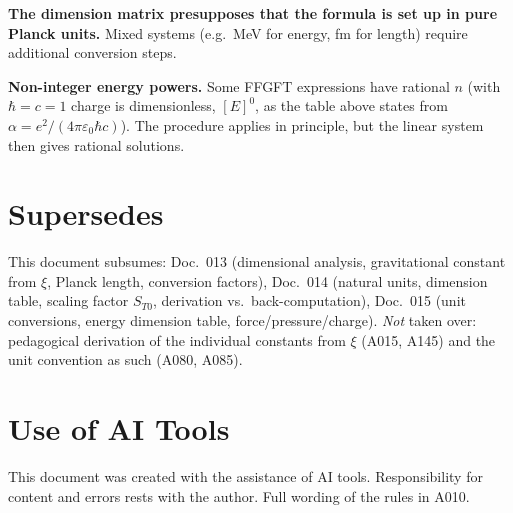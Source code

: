 \textbf{The dimension matrix presupposes that the formula is set up in pure Planck
units.} Mixed systems (e.g.\ MeV for energy, fm for length) require additional
conversion steps.

\textbf{Non-integer energy powers.} Some FFGFT expressions have rational $n$ (with $\hbar=c=1$ charge is dimensionless, $[E]^0$, as the table above states from $\alpha=e^2/(4\pi\varepsilon_0\hbar c)$). The procedure applies in principle, but the linear
system then gives rational solutions.

\section{Supersedes}

This document subsumes: Doc.~013 (dimensional analysis, gravitational constant
from $\xi$, Planck length, conversion factors), Doc.~014 (natural units,
dimension table, scaling factor $S_{T0}$, derivation vs.\ back-computation),
Doc.~015 (unit conversions, energy dimension table, force/pressure/charge).
\emph{Not} taken over: pedagogical derivation of the individual constants from
$\xi$ (A015, A145) and the unit convention as such (A080, A085).

\section{Use of AI Tools}

This document was created with the assistance of AI tools. Responsibility
for content and errors rests with the author. Full wording of the rules in A010.
